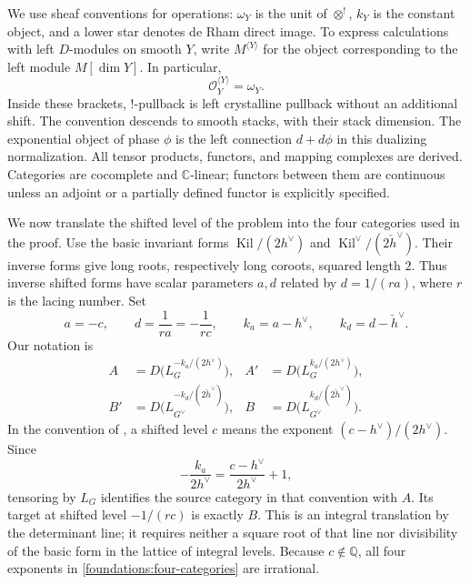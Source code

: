 We use sheaf conventions for operations: $\omega_Y$ is the unit of
$\otimes^!$, $k_Y$ is the constant object, and a lower star denotes de Rham
direct image.  To express calculations with left $D$-modules on smooth
$Y$, write $M^{\langle Y\rangle}$ for the object corresponding to the left
module $M[\dim Y]$.  In particular,
\[
 \mathcal O_Y^{\langle Y\rangle}=\omega_Y.
\]
Inside these brackets, $!$-pullback is left crystalline pullback without
an additional shift.  The convention descends to smooth stacks, with their
stack dimension.  The exponential object of phase $\phi$ is the left
connection $d+d\phi$ in this dualizing normalization.  All tensor products,
functors, and mapping complexes are derived.  Categories are cocomplete
and $\mathbb C$-linear; functors between them are continuous unless an
adjoint or a partially defined functor is explicitly specified.

We now translate the shifted level of the problem into the four categories
used in the proof.  Use the basic invariant forms
$\operatorname{Kil}/(2h^\vee)$ and
$\operatorname{Kil}^{\vee}/(2\check h^\vee)$.  Their inverse forms give
long roots, respectively long coroots, squared length $2$.  Thus inverse
shifted forms have scalar parameters $a,d$ related by $d=1/(ra)$, where
$r$ is the lacing number.  Set
\begin{equation}\label{foundations:levels}
 a=-c,\qquad d=\frac1{ra}=-\frac1{rc},\qquad
 k_a=a-h^\vee,\qquad k_d=d-\check h^\vee.
\end{equation}
Our notation is
\begin{equation}\label{foundations:four-categories}
 \begin{aligned}
 A&=D\bigl(L_G^{-k_a/(2h^\vee)}\bigr),&
 A'&=D\bigl(L_G^{k_a/(2h^\vee)}\bigr),\\
 B'&=D\bigl(L_{G^\vee}^{-k_d/(2\check h^\vee)}\bigr),&
 B&=D\bigl(L_{G^\vee}^{k_d/(2\check h^\vee)}\bigr).
 \end{aligned}
\end{equation}
In the convention of \cite[Section~1.1.5]{BogdanovaBetti}, a shifted level
$c$ means the exponent $(c-h^\vee)/(2h^\vee)$.  Since
\[
 -\frac{k_a}{2h^\vee}
 =\frac{c-h^\vee}{2h^\vee}+1,
\]
tensoring by $L_G$ identifies the source category in that convention with
$A$.  Its target at shifted level $-1/(rc)$ is exactly $B$.
This is an integral translation by the determinant line; it requires
neither a square root of that line nor divisibility of the basic form in
the lattice of integral levels.  Because $c\notin\mathbb Q$, all four
exponents in \eqref{foundations:four-categories} are irrational.

